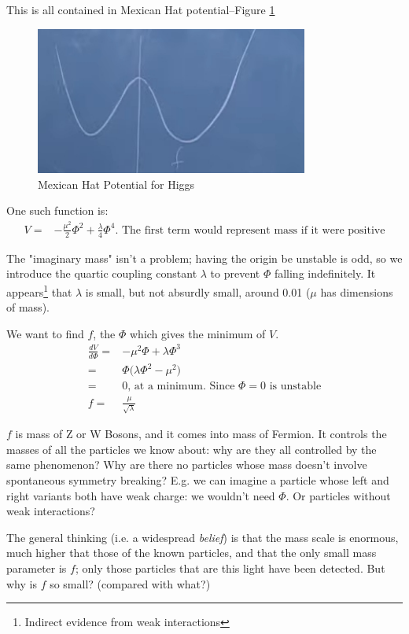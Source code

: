\documentclass[]{article}
\begin{document}
This is all contained in Mexican Hat potential--Figure \ref{fig:2-10-MexicanHat}
\begin{figure}[H]
	\caption{Mexican Hat Potential for Higgs}\label{fig:2-10-MexicanHat}
	\includegraphics[width=0.8\textwidth]{2-10-MexicanHat}
\end{figure}
One such function is:
\begin{align*}
	V =& -\frac{\mu^2}{2} \Phi^2 + \frac{\lambda}{4} \Phi^4 \text{. The first term would represent mass if it were positive}
\end{align*}

The "imaginary mass" isn't a problem; having the origin be unstable is odd, so we introduce the quartic coupling constant $\lambda$ to prevent $\Phi$ falling indefinitely. It appears\footnote{Indirect evidence from weak interactions} that $\lambda$ is small, but not absurdly small, around 0.01 ($\mu$ has dimensions of mass).

We want to find $f$, the $\Phi$ which gives the minimum of $V$.
\begin{align*}
	\frac{d V}{d \Phi} =& -\mu^2 \Phi + \lambda \Phi^3\\
	=& \Phi \big(\lambda \Phi^2 - \mu^2\big)\\
	=& 0 \text{, at a minimum. Since $\Phi=0$ is unstable}\\
	f =& \frac{\mu}{\sqrt{\lambda}}
\end{align*}

$f$ is mass of Z or W Bosons, and it comes into mass of Fermion. It controls the masses of all the particles we know about: why are they all controlled by the same phenomenon? Why are there no particles whose mass doesn't involve spontaneous symmetry breaking? E.g. we can imagine a particle whose left and right variants both have weak charge: we wouldn't need $\Phi$. Or particles without weak interactions?

The general thinking (i.e. a widespread \emph{belief}) is that the mass scale is enormous, much higher that those of the known particles, and that the only small mass parameter is $f$; only those particles that are this light have been detected. But why is $f$ so small? (compared with what?) 
\end{document}

